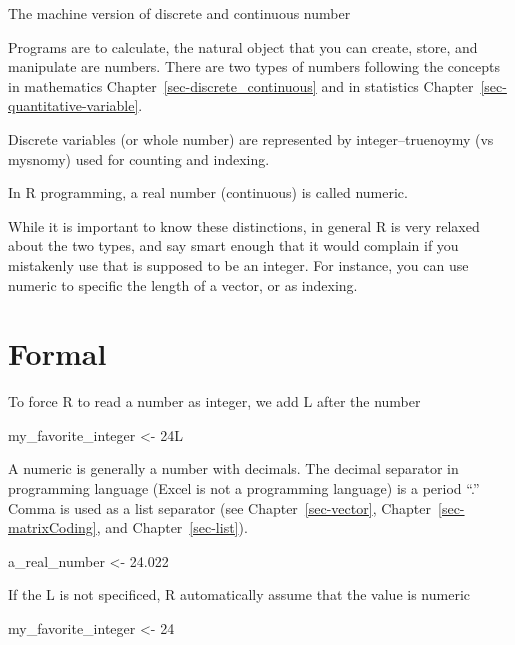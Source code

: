 \documentclass[
  letterpaper,
  DIV=11,
  numbers=noendperiod]{scrreprt}
\newenvironment{Shaded}{\begin{snugshade}}{\end{snugshade}}
\newcommand{\DecValTok}[1]{\textcolor[rgb]{0.68,0.00,0.00}{#1}}
\newcommand{\FloatTok}[1]{\textcolor[rgb]{0.68,0.00,0.00}{#1}}
\newcommand{\NormalTok}[1]{\textcolor[rgb]{0.00,0.23,0.31}{#1}}
\newcommand{\OtherTok}[1]{\textcolor[rgb]{0.00,0.23,0.31}{#1}}
\begin{document}
The machine version of discrete and continuous number

Programs are to calculate, the natural object that you can create,
store, and manipulate are numbers. There are two types of numbers
following the concepts in mathematics
Chapter~\ref{sec-discrete_continuous} and in statistics
Chapter~\ref{sec-quantitative-variable}.

Discrete variables (or whole number) are represented by
integer--truenoymy (vs mysnomy) used for counting and indexing.

In R programming, a real number (continuous) is called numeric.

While it is important to know these distinctions, in general R is very
relaxed about the two types, and say smart enough that it would complain
if you mistakenly use that is supposed to be an integer. For instance,
you can use numeric to specific the length of a vector, or as indexing.

\section*{Formal}\label{formal-29}


To force R to read a number as integer, we add L after the number

\begin{Shaded}
\begin{Highlighting}[]
\NormalTok{my\_favorite\_integer }\OtherTok{\textless{}{-}} \DecValTok{24}\NormalTok{L}
\end{Highlighting}
\end{Shaded}

A numeric is generally a number with decimals. The decimal separator in
programming language (Excel is not a programming language) is a period
``.'' Comma is used as a list separator (see Chapter~\ref{sec-vector},
Chapter~\ref{sec-matrixCoding}, and Chapter~\ref{sec-list}).

\begin{Shaded}
\begin{Highlighting}[]
\NormalTok{a\_real\_number }\OtherTok{\textless{}{-}} \FloatTok{24.022}
\end{Highlighting}
\end{Shaded}

If the L is not specificed, R automatically assume that the value is
numeric

\begin{Shaded}
\begin{Highlighting}[]
\NormalTok{my\_favorite\_integer }\OtherTok{\textless{}{-}} \DecValTok{24}
\end{Highlighting}
\end{Shaded}
\end{document}
